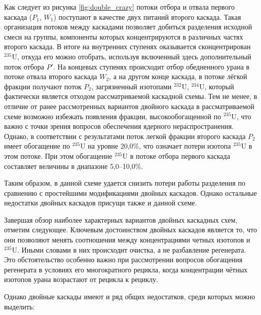 Как следует из рисунка \ref{fig:double_crazy} потоки отбора и отвала первого каскада ($P_1$, $W_1$) поступают в качестве двух питаний второго каскада. Такая организация потоков между каскадами позволяет добиться разделения исходной смеси на группы, компоненты которых концентрируются в различных частях второго каскада. В итоге на внутренних ступенях оказывается сконцентрирован $^{235}$U, откуда его можно отобрать, используя включенный здесь дополнительный поток отбора $P'$. На концевых ступенях происходит отбор обедненного урана в потоке отвала второго каскада $W_2$, а на другом конце каскада, в потоке лёгкой фракции получают поток $P_2$, загрязненный изотопами $^{232}$U, $^{234}$U, который фактически является отходом рассматриваемой каскадной схемы. Тем не менее, в отличие от ранее рассмотренных вариантов двойного каскада в рассматриваемой схеме возможно избежать появления фракции, высокообогащенной по $^{235}$U, что важно с точки зрения вопросов обеспечения ядерного нераспространения. Однако, в соответствии с результатами \cite{SposobIzotopnogoVosstanovleniyac} поток легкой фракции второго каскада $P_2$ имеет обогащение по $^{235}$U на уровне 20,0\%, что означает потери изотопа $^{235}$U в этом потоке. При этом обогащение $^{235}$U в потоке отбора первого каскада составляет величины в диапазоне 5,0--10,0\%.
 
Таким образом, в данной схеме удается снизить потери работы разделения по сравнению с простейшими модификациями двойных каскадов. Однако остальные недостатки двойных каскадов присущи также и данной схеме. 

Завершая обзор наиболее характерных вариантов двойных каскадных схем, отметим следующее. 
Ключевым достоинством двойных каскадов является то, что они позволяют менять соотношения между концентрациями четных изотопов и $^{235}$U. Иными словами в них происходит очистка, а не разбавление регенерата. Это обстоятельство особенно важно при рассмотрении вопросов обогащения регенерата в условиях его многократного рецикла, когда концентрации чётных изотопов урана возрастают от рецикла к рециклу.

Однако двойные каскады имеют и ряд общих недостатков, среди которых можно выделить:

